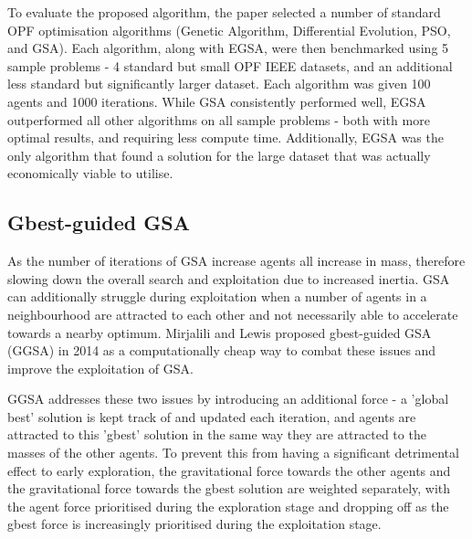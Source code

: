 To evaluate the proposed algorithm, the paper selected a number of standard OPF optimisation algorithms (Genetic Algorithm, Differential Evolution, PSO, and GSA).
Each algorithm, along with EGSA, were then benchmarked using 5 sample problems - 4 standard but small OPF IEEE datasets, and an additional less standard but significantly larger dataset.
Each algorithm was given 100 agents and 1000 iterations.
While GSA consistently performed well, EGSA outperformed all other algorithms on all sample problems - both with more optimal results, and requiring less compute time.
Additionally, EGSA was the only algorithm that found a solution for the large dataset that was actually economically viable to utilise.



\subsection{Gbest-guided GSA}\label{sec:alg:gsa:ggsa}
As the number of iterations of GSA increase agents all increase in mass, therefore slowing down the overall search and exploitation due to increased inertia.
GSA can additionally struggle during exploitation when a number of agents in a neighbourhood are attracted to each other and not necessarily able to accelerate towards a nearby optimum.
Mirjalili and Lewis \cite{GGSA} proposed gbest-guided GSA (GGSA) in 2014 as a computationally cheap way to combat these issues and improve the exploitation of GSA.


GGSA addresses these two issues by introducing an additional force - a 'global best' solution is kept track of and updated each iteration, and agents are attracted to this 'gbest' solution in the same way they are attracted to the masses of the other agents.
To prevent this from having a significant detrimental effect to early exploration, the gravitational force towards the other agents and the gravitational force towards the gbest solution are weighted separately, with the agent force prioritised during the exploration stage and dropping off as the gbest force is increasingly prioritised during the exploitation stage.


